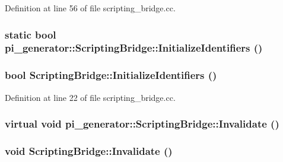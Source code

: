 Definition at line 56 of file scripting\_\-bridge.cc.

\hypertarget{classpi__generator_1_1_scripting_bridge_ab1274471c47d3f5d1a56f3a604e0efff}{
\subsubsection[{InitializeIdentifiers}]{\setlength{\rightskip}{0pt plus 5cm}static bool pi\_\-generator::ScriptingBridge::InitializeIdentifiers ()}}
\label{classpi__generator_1_1_scripting_bridge_ab1274471c47d3f5d1a56f3a604e0efff}
\hypertarget{classpi__generator_1_1_scripting_bridge_a05f2a65b751d12e6aeaa00bfd91ef83f}{
\subsubsection[{InitializeIdentifiers}]{\setlength{\rightskip}{0pt plus 5cm}bool ScriptingBridge::InitializeIdentifiers ()}}
\label{classpi__generator_1_1_scripting_bridge_a05f2a65b751d12e6aeaa00bfd91ef83f}


Definition at line 22 of file scripting\_\-bridge.cc.

\hypertarget{classpi__generator_1_1_scripting_bridge_a7b991ca4653d4a447d6a3f8760261780}{
\subsubsection[{Invalidate}]{\setlength{\rightskip}{0pt plus 5cm}virtual void pi\_\-generator::ScriptingBridge::Invalidate ()}}
\label{classpi__generator_1_1_scripting_bridge_a7b991ca4653d4a447d6a3f8760261780}
\hypertarget{classpi__generator_1_1_scripting_bridge_af00ea5a26438b33f976734a3432dfa9b}{
\subsubsection[{Invalidate}]{\setlength{\rightskip}{0pt plus 5cm}void ScriptingBridge::Invalidate ()}}
\label{classpi__generator_1_1_scripting_bridge_af00ea5a26438b33f976734a3432dfa9b}


